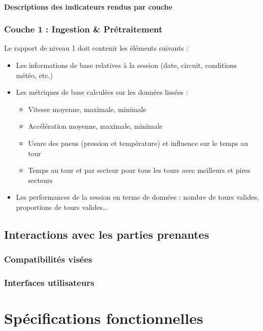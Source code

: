\documentclass[a4paper,12pt]{report}
\begin{document}
\subsubsection{Descriptions des indicateurs rendus par couche}

\subsection{Couche 1 : Ingestion \& Prétraitement}

Le rapport de niveau 1 doit contenir les éléments suivants :
\begin{itemize}
    \item Les informations de base relatives à la session (date, circuit, conditions météo, etc.)
    \item Les métriques de base calculées sur les données lissées :
    \begin{itemize}
        \item Vitesse moyenne, maximale, minimale
        \item Accélération moyenne, maximale, minimale
        \item Usure des pneus (pression et température) et influence sur le temps au tour
        \item Temps au tour et par secteur pour tous les tours avec meilleurs et pires secteurs
    \end{itemize}
    \item Les performances de la session en terme de données : nombre de tours valides, proportions de tours valides\dots
\end{itemize} 

\section{Interactions avec les parties prenantes}

\subsection{Compatibilités visées}

\subsection{Interfaces utilisateurs}

\chapter{Spécifications fonctionnelles}
\end{document}
